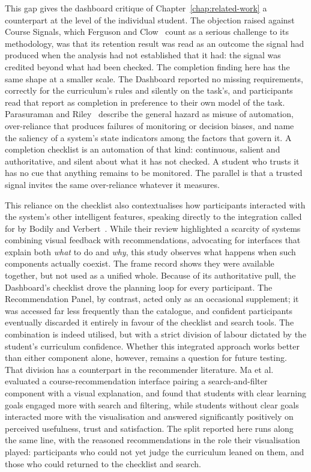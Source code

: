 This gap gives the dashboard critique of Chapter~\ref{chap:related-work} a counterpart at the level of the individual student. The objection raised against Course Signals, which Ferguson and Clow~\cite{ferguson_evidence_2017} count as a serious challenge to its methodology, was that its retention result was read as an outcome the signal had produced when the analysis had not established that it had: the signal was credited beyond what had been checked. The completion finding here has the same shape at a smaller scale. The Dashboard reported no missing requirements, correctly for the curriculum's rules and silently on the task's, and participants read that report as completion in preference to their own model of the task. Parasuraman and Riley~\cite{parasuraman1997humans} describe the general hazard as misuse of automation, over-reliance that produces failures of monitoring or decision biases, and name the saliency of a system's state indicators among the factors that govern it. A completion checklist is an automation of that kind: continuous, salient and authoritative, and silent about what it has not checked. A student who trusts it has no cue that anything remains to be monitored. The parallel is that a trusted signal invites the same over-reliance whatever it measures.

This reliance on the checklist also contextualises how participants interacted with the system's other intelligent features, speaking directly to the integration called for by Bodily and Verbert~\cite{bodily_review_2017}. While their review highlighted a scarcity of systems combining visual feedback with recommendations, advocating for interfaces that explain both \emph{what} to do and \emph{why}, this study observes what happens when such components actually coexist. The frame record shows they were available together, but not used as a unified whole. Because of its authoritative pull, the Dashboard's checklist drove the planning loop for every participant. The Recommendation Panel, by contrast, acted only as an occasional supplement; it was accessed far less frequently than the catalogue, and confident participants eventually discarded it entirely in favour of the checklist and search tools. The combination is indeed utilised, but with a strict division of labour dictated by the student's curriculum confidence. Whether this integrated approach works better than either component alone, however, remains a question for future testing. That division has a counterpart in the recommender literature. Ma et al.~\cite{ma_courseq_2021} evaluated a course-recommendation interface pairing a search-and-filter component with a visual explanation, and found that students with clear learning goals engaged more with search and filtering, while students without clear goals interacted more with the visualisation and answered significantly positively on perceived usefulness, trust and satisfaction. The split reported here runs along the same line, with the reasoned recommendations in the role their visualisation played: participants who could not yet judge the curriculum leaned on them, and those who could returned to the checklist and search.

